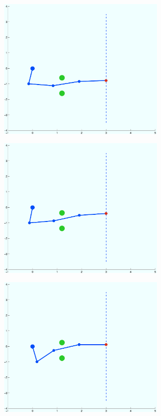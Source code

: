 \documentclass[a4paper, 11pt, english, greek]{article}
\begin{document}
\begin{figure}[htb]
  \centering
  \includegraphics[width=300px]{test4}
  \caption{}
\end{figure}

\begin{figure}[htb]
  \centering
  \includegraphics[width=300px]{test5}
  \caption{}
\end{figure}

\begin{figure}[htb]
  \centering
  \includegraphics[width=300px]{test6}
  \caption{}
\end{figure}
\end{document}
